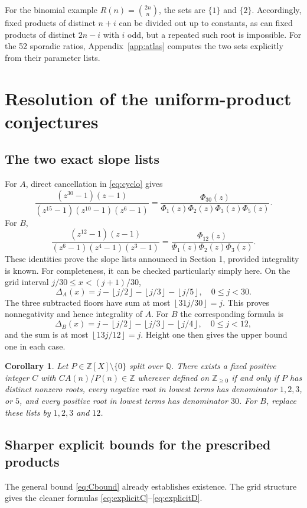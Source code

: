 \documentclass[11pt]{article}
\newtheorem{corollary}[theorem]{Corollary}
\theoremstyle{definition}
\theoremstyle{remark}
\newcommand{\Z}{\mathbb Z}
\newcommand{\Q}{\mathbb Q}
\newcommand{\floor}[1]{\left\lfloor #1\right\rfloor}
\begin{document}
For the binomial example $R(n)=\binom{2n}{n}$, the sets are
$\{1\}$ and $\{2\}$. Accordingly, fixed products of distinct
$n+i$ can be divided out up to constants, as can fixed products of
distinct $2n-i$ with $i$ odd, but a repeated such root is impossible.
For the 52 sporadic ratios, Appendix~\ref{app:atlas} computes the two
sets explicitly from their parameter lists.

\section{Resolution of the uniform-product conjectures}
\subsection{The two exact slope lists}
For $A$, direct cancellation in \eqref{eq:cyclo} gives
\begin{equation}\label{eq:cycloA}
 \frac{(z^{30}-1)(z-1)}{(z^{15}-1)(z^{10}-1)(z^6-1)}
 =\frac{\Phi_{30}(z)}{\Phi_1(z)\Phi_2(z)\Phi_3(z)\Phi_5(z)}.
\end{equation}
For $B$,
\begin{equation}\label{eq:cycloB}
 \frac{(z^{12}-1)(z-1)}{(z^6-1)(z^4-1)(z^3-1)}
 =\frac{\Phi_{12}(z)}{\Phi_1(z)\Phi_2(z)\Phi_3(z)}.
\end{equation}
These identities prove the slope lists announced in Section 1, provided
integrality is known. For completeness, it can be checked particularly
simply here. On the grid interval $j/30\leq x<(j+1)/30$,
\[
 \Delta_A(x)=j-\floor{j/2}-\floor{j/3}-\floor{j/5},\quad 0\leq j<30.
\]
The three subtracted floors have sum at most
$\floor{31j/30}=j$. This proves nonnegativity and hence integrality
of $A$. For $B$ the corresponding formula is
\[
 \Delta_B(x)=j-\floor{j/2}-\floor{j/3}-\floor{j/4},\quad 0\leq j<12,
\]
and the sum is at most $\floor{13j/12}=j$. Height one then gives the
upper bound one in each case.

\begin{corollary}\label{cor:classificationAB}
Let $P\in\Z[X]\setminus\{0\}$ split over $\Q$. There exists a fixed
positive integer $C$ with $CA(n)/P(n)\in\Z$ wherever defined on
$\Z_{\geq0}$ if and only if $P$ has distinct nonzero roots, every
negative root in lowest terms has denominator $1,2,3$, or $5$, and
every positive root in lowest terms has denominator $30$.
For $B$, replace these lists by $1,2,3$ and $12$.
\end{corollary}

\subsection{Sharper explicit bounds for the prescribed products}
The general bound \eqref{eq:Cbound} already establishes existence.
The grid structure gives the cleaner formulas
\eqref{eq:explicitC}--\eqref{eq:explicitD}.
\end{document}
